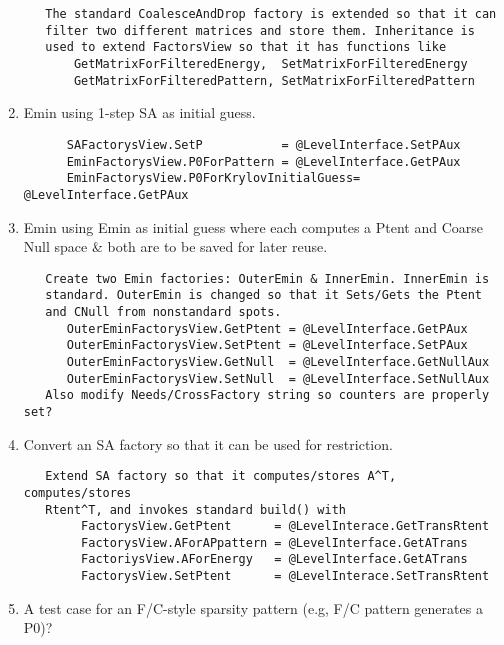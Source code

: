 \documentclass{siamltex}
\numberwithin{algorithm}{section}  %
\begin{document}
\begin{enumerate}
\begin{verbatim}
   The standard CoalesceAndDrop factory is extended so that it can 
   filter two different matrices and store them. Inheritance is
   used to extend FactorsView so that it has functions like
       GetMatrixForFilteredEnergy,  SetMatrixForFilteredEnergy 
       GetMatrixForFilteredPattern, SetMatrixForFilteredPattern
   \end{verbatim}
\item Emin using 1-step SA as initial guess.
   \begin{verbatim}
      SAFactorysView.SetP           = @LevelInterface.SetPAux
      EminFactorysView.P0ForPattern = @LevelInterface.GetPAux
      EminFactorysView.P0ForKrylovInitialGuess= @LevelInterface.GetPAux
   \end{verbatim}
\item Emin using Emin as initial guess where each computes a Ptent and Coarse Null space \& both are to be saved for later reuse.
   \begin{verbatim}
   Create two Emin factories: OuterEmin & InnerEmin. InnerEmin is
   standard. OuterEmin is changed so that it Sets/Gets the Ptent
   and CNull from nonstandard spots.
      OuterEminFactorysView.GetPtent = @LevelInterface.GetPAux
      OuterEminFactorysView.SetPtent = @LevelInterface.SetPAux
      OuterEminFactorysView.GetNull  = @LevelInterface.GetNullAux
      OuterEminFactorysView.SetNull  = @LevelInterface.SetNullAux
   Also modify Needs/CrossFactory string so counters are properly set?
   \end{verbatim}
\item Convert an SA factory so that it can be used for restriction.
   \begin{verbatim}
   Extend SA factory so that it computes/stores A^T, computes/stores
   Rtent^T, and invokes standard build() with
        FactorysView.GetPtent      = @LevelInterace.GetTransRtent
        FactorysView.AForAPpattern = @LevelInterface.GetATrans
        FactoriysView.AForEnergy   = @LevelInterface.GetATrans
        FactorysView.SetPtent      = @LevelInterace.SetTransRtent
   \end{verbatim}
\item A test case for an F/C-style sparsity pattern (e.g,
      F/C pattern generates a P0)?
\end{enumerate}


\end{document}
